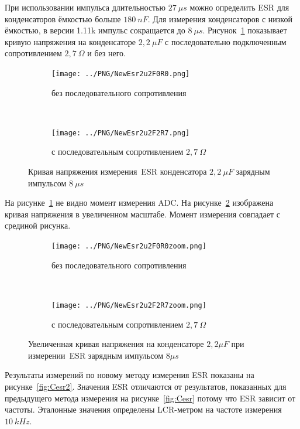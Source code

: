 При использовании импульса длительностью \(27~\mu s\) можно определить ESR для конденсаторов ёмкостью больше \(180~nF\).
Для измерения конденсаторов с низкой ёмкостью, в версии 1.11k импульс сокращается до \(8~\mu s\).
Рисунок~\ref{pic:NewEsr2} показывает кривую напряжения на конденсаторе \(2,2~\mu F\) с 
последовательно подключенным сопротивлением \(2,7~\Omega\) и без него.

\begin{figure}[H]
  \begin{subfigure}[b]{.5\textwidth}
    \centering
    \texttt{[image: ../PNG/NewEsr2u2F0R0.png]}
    \caption{без последовательного сопротивления}
  \end{subfigure}
  ~
  \begin{subfigure}[b]{.5\textwidth}
    \centering
    \texttt{[image: ../PNG/NewEsr2u2F2R7.png]}
    \caption{с последовательным сопротивлением \(2,7~\Omega\)}
  \end{subfigure}
  \caption{Кривая напряжения измерения~ESR конденсатора \(2,2~\mu F\) зарядным импульсом \(8~\mu s\)}
  \label{pic:NewEsr2}
\end{figure}

На рисунке~\ref{pic:NewEsr2} не видно момент измерения ADC. 
На рисунке~\ref{pic:NewEsr2zoom} изображена кривая напряжения в увеличенном масштабе. 
Момент измерения совпадает с срединой рисунка.

\begin{figure}[H]
  \begin{subfigure}[b]{.5\textwidth}
    \centering
    \texttt{[image: ../PNG/NewEsr2u2F0R0zoom.png]}
    \caption{без последовательного сопротивления}
  \end{subfigure}
  ~
  \begin{subfigure}[b]{.5\textwidth}
    \centering
    \texttt{[image: ../PNG/NewEsr2u2F2R7zoom.png]}
    \caption{с последовательным сопротивлением \(2,7~\Omega\)}
  \end{subfigure}
  \caption{Увеличенная кривая напряжения на конденсаторе \(2,2\mu F\) при измерении~ESR зарядным импульсом \(8 \mu s\)}
  \label{pic:NewEsr2zoom}
\end{figure}


Результаты измерений по новому методу измерения ESR показаны на рисунке~\ref{fig:Cesr2}.
Значения ESR отличаются от результатов, показанных для предыдущего метода измерения на рисунке~\ref{fig:Cesr} потому 
что ESR зависит от частоты. Эталонные значения определены  LCR-метром на частоте измерения \(10~kHz \).

